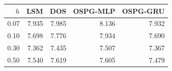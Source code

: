 \begin{tabular}{rrrrr}
\toprule
$h$ & LSM & DOS & OSPG-MLP & OSPG-GRU \\
\midrule
0.07 & 7.935 & 7.985 & 8.136 & 7.932 \\
0.10 & 7.698 & 7.776 & 7.934 & 7.690 \\
0.30 & 7.362 & 7.435 & 7.507 & 7.367 \\
0.50 & 7.540 & 7.619 & 7.605 & 7.479 \\
\bottomrule
\end{tabular}
